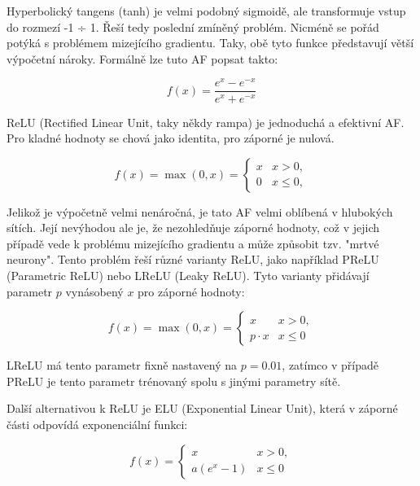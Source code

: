 Hyperbolický tangens (tanh) je velmi podobný sigmoidě, ale transformuje vstup
do rozmezí -1 ÷ 1. Řeší tedy poslední zmíněný problém. Nicméně se pořád potýká
s problémem mizejícího gradientu. Taky, obě tyto funkce představují větší
výpočetní nároky. Formálně lze tuto AF popsat takto:

\begin{equation*}
    f(x)= \frac{e^x-e^{-x}}{e^x+e^{-x}}
\end{equation*}

ReLU (Rectified Linear Unit, taky někdy rampa) je jednoduchá a efektivní AF.
Pro kladné hodnoty se chová jako identita, pro záporné je nulová.

\begin{equation*}
    f(x)=\max(0,x)=\begin{cases}x&x>0,\\0&x\leq0,\end{cases}
\end{equation*}

Jelikož je výpočetně velmi nenáročná, je tato AF velmi oblíbená v hlubokých
sítích. Její nevýhodou ale je, že nezohledňuje záporné hodnoty, což v jejich
případě vede k problému mizejícího gradientu a může způsobit tzv. "mrtvé
neurony". Tento problém řeší různé varianty ReLU, jako například PReLU
(Parametric ReLU) nebo LReLU (Leaky ReLU). Tyto varianty přidávají parametr $p$
vynásobený $x$ pro záporné hodnoty:

\begin{equation*}
    f(x)=\max(0,x)=\begin{cases}x&x>0,\\p \cdot x&x\leq0\end{cases}
\end{equation*}

LReLU má tento parametr fixně nastavený na $p=0.01$, zatímco v případě PReLU je
tento parametr trénovaný spolu s jinými parametry sítě.

Další alternativou k ReLU je ELU (Exponential Linear Unit), která v záporné
části odpovídá exponenciální funkci:

\begin{equation*}
    f(x)=\begin{cases}x&x>0,\\a \left(e^{x}-1\right)&x\leq0\end{cases}
\end{equation*}

